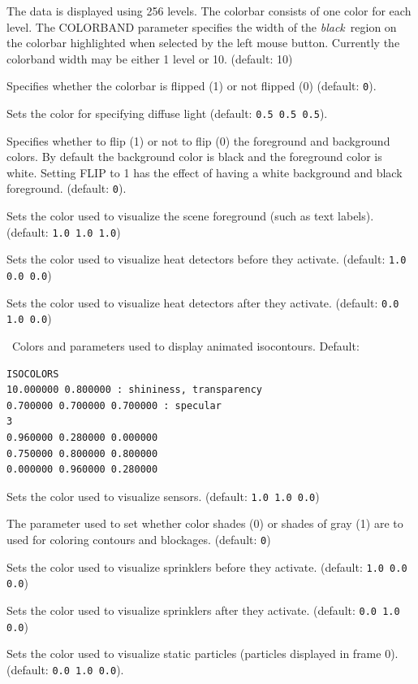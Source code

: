 \documentclass[11pt,twoside]{book}
\newcommand{\hitem}[1]{\item[{\bf #1} \hfill]}
\begin{document}
\hitem{COLORBAND} The data is displayed using 256 levels.  The colorbar consists of one color for each level.  The COLORBAND parameter specifies the width of the {\em black}\ region on the colorbar highlighted when selected by the left mouse button.  Currently the colorband width may be either 1 level or 10. (default: 10)

\hitem{COLORBARFLIP} Specifies whether the colorbar is flipped (1) or not flipped (0)
(default: {\tt 0}).
\hitem{DIFFUSELIGHT} Sets the color for specifying diffuse light (default: {\tt 0.5 0.5
0.5}).
\hitem{FLIP} Specifies whether to flip (1) or not to flip (0) the foreground and background
colors.  By default the background color is black and the foreground color
is white.  Setting FLIP to 1 has the effect of having a white background and black foreground.
(default: {\tt 0}).

\hitem{FOREGROUNDCOLOR}Sets the color used to visualize
the scene foreground (such as text labels).
(default: {\tt 1.0 1.0 1.0})

\hitem{HEATOFFCOLOR}Sets the color used to visualize
heat detectors before they activate.
(default: {\tt 1.0 0.0 0.0})

\hitem{HEATONCOLOR}Sets the color used to visualize
heat detectors after they activate.
(default: {\tt 0.0 1.0 0.0})


\hitem{ISOCOLORS}\ Colors and parameters used to display animated isocontours.
Default:
\begin{lstlisting}
ISOCOLORS
10.000000 0.800000 : shininess, transparency
0.700000 0.700000 0.700000 : specular
3
0.960000 0.280000 0.000000
0.750000 0.800000 0.800000
0.000000 0.960000 0.280000
\end{lstlisting}

\hitem{SENSORCOLOR}Sets the color used to visualize sensors.
(default: {\tt 1.0 1.0 0.0})

\hitem{SETBW}The parameter used to set whether color shades (0) or shades of gray (1)
are to used for coloring contours and blockages.
(default: {\tt 0})

\hitem{SPRINKOFFCOLOR}Sets the color used to visualize
sprinklers before they activate.
(default: {\tt 1.0 0.0 0.0})

\hitem{SPRINKONCOLOR}Sets the color used to visualize
sprinklers after they activate.
(default: {\tt 0.0 1.0 0.0})

\hitem{STATICPARTCOLOR}Sets the color used to visualize static particles (particles
displayed in frame 0).
 (default: {\tt 0.0 1.0 0.0}).
\end{document}
